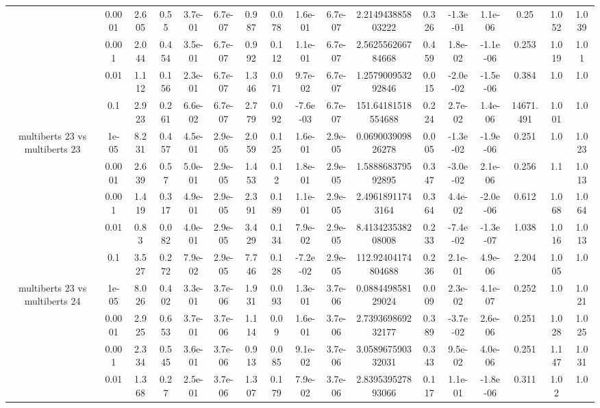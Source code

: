 \begin{tabular}{|c|c|c|c|c|c|c|c|c|c|c|c|c|c|c|c|c|}
 & 0.0001 & 2.605 & 0.55 & 3.7e-01 & 6.7e-07 & 0.987 & 0.078 & 1.6e-01 & 6.7e-07 & 2.214943885803222 & 0.326 & -1.3e-01 & 1.1e-06 & 0.25 & 1.052 & 1.039 \\
 & 0.001 & 2.044 & 0.454 & 3.5e-01 & 6.7e-07 & 0.992 & 0.112 & 1.1e-01 & 6.7e-07 & 2.562556266784668 & 0.459 & 1.8e-02 & -1.1e-06 & 0.253 & 1.019 & 1.01 \\
 & 0.01 & 1.112 & 0.156 & 2.3e-01 & 6.7e-07 & 1.346 & 0.071 & 9.7e-02 & 6.7e-07 & 1.257900953292846 & 0.015 & -2.0e-02 & -1.5e-06 & 0.384 & 1.0 & 1.0 \\
 & 0.1 & 2.923 & 0.261 & 6.6e-02 & 6.7e-07 & 2.779 & 0.092 & -7.6e-03 & 6.7e-07 & 151.64181518554688 & 0.224 & 2.7e-02 & 1.4e-06 & 14671.491 & 1.001 & 1.0 \\
\hline
\multirow{5}{*}{multiberts 23 vs multiberts 23} & 1e-05 & 8.231 & 0.457 & 4.5e-01 & 2.9e-05 & 2.059 & 0.125 & 1.6e-01 & 2.9e-05 & 0.069003909826278 & 0.005 & -1.3e-02 & -1.9e-06 & 0.251 & 1.0 & 1.023 \\
 & 0.0001 & 2.639 & 0.57 & 5.0e-01 & 2.9e-05 & 1.453 & 0.12 & 1.8e-01 & 2.9e-05 & 1.588868379592895 & 0.347 & -3.0e-02 & 2.1e-06 & 0.256 & 1.1 & 1.013 \\
 & 0.001 & 1.419 & 0.317 & 4.9e-01 & 2.9e-05 & 2.391 & 0.189 & 1.1e-01 & 2.9e-05 & 2.49618911743164 & 0.364 & 4.4e-02 & -2.0e-06 & 0.612 & 1.068 & 1.064 \\
 & 0.01 & 0.83 & 0.082 & 4.0e-01 & 2.9e-05 & 3.429 & 0.134 & 7.9e-02 & 2.9e-05 & 8.413423538208008 & 0.233 & -7.4e-02 & -1.3e-07 & 1.038 & 1.016 & 1.013 \\
 & 0.1 & 3.527 & 0.272 & 7.9e-02 & 2.9e-05 & 7.746 & 0.128 & -7.2e-02 & 2.9e-05 & 112.92404174804688 & 0.236 & 2.1e-01 & 4.9e-06 & 2.204 & 1.005 & 1.0 \\
\hline
\multirow{5}{*}{multiberts 23 vs multiberts 24} & 1e-05 & 8.026 & 0.402 & 3.3e-01 & 3.7e-06 & 1.931 & 0.093 & 1.3e-01 & 3.7e-06 & 0.088449858129024 & 0.009 & 2.3e-02 & 4.1e-07 & 0.252 & 1.0 & 1.021 \\
 & 0.0001 & 2.925 & 0.653 & 3.7e-01 & 3.7e-06 & 1.114 & 0.09 & 1.6e-01 & 3.7e-06 & 2.739369869232177 & 0.389 & -3.7e-02 & 2.6e-06 & 0.251 & 1.028 & 1.025 \\
 & 0.001 & 2.334 & 0.545 & 3.6e-01 & 3.7e-06 & 0.913 & 0.085 & 9.1e-02 & 3.7e-06 & 3.058967590332031 & 0.343 & 9.5e-02 & 4.0e-06 & 0.251 & 1.147 & 1.031 \\
 & 0.01 & 1.368 & 0.27 & 2.5e-01 & 3.7e-06 & 1.307 & 0.179 & 7.9e-02 & 3.7e-06 & 2.839539527893066 & 0.117 & 1.1e-01 & -1.8e-06 & 0.311 & 1.02 & 1.0 \\

\end{tabular}
